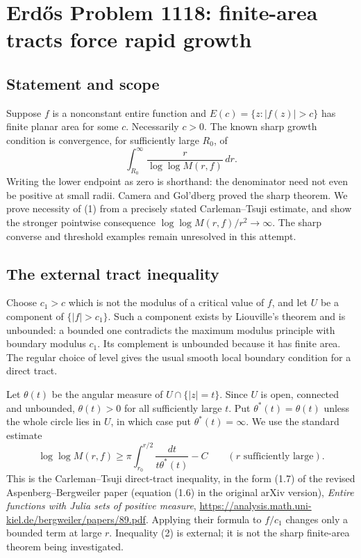 \section*{Erd\H{o}s Problem 1118: finite-area tracts force rapid growth}
\subsection*{Statement and scope}
Suppose $f$ is a nonconstant entire function and $E(c)=\{z:|f(z)|>c\}$ has finite planar area for some $c$. Necessarily $c>0$. The known sharp growth condition is convergence, for sufficiently large $R_0$, of
\[
 \int_{R_0}^{\infty}\frac{r}{\log\log M(r,f)}\,dr.
 \tag{1}
\]
Writing the lower endpoint as zero is shorthand: the denominator need not even be positive at small radii. Camera and Gol'dberg proved the sharp theorem. We prove necessity of (1) from a precisely stated Carleman--Tsuji estimate, and show the stronger pointwise consequence $\log\log M(r,f)/r^2\to\infty$. The sharp converse and threshold examples remain unresolved in this attempt.

\subsection*{The external tract inequality}
Choose $c_1>c$ which is not the modulus of a critical value of $f$, and let $U$ be a component of $\{|f|>c_1\}$. Such a component exists by Liouville's theorem and is unbounded: a bounded one contradicts the maximum modulus principle with boundary modulus $c_1$. Its complement is unbounded because it has finite area. The regular choice of level gives the usual smooth local boundary condition for a direct tract.

Let $\theta(t)$ be the angular measure of $U\cap\{|z|=t\}$. Since $U$ is open, connected and unbounded, $\theta(t)>0$ for all sufficiently large $t$. Put $\theta^*(t)=\theta(t)$ unless the whole circle lies in $U$, in which case put $\theta^*(t)=\infty$.
We use the standard estimate
\[
 \log\log M(r,f)\ge
 \pi\int_{r_0}^{r/2}\frac{dt}{t\theta^*(t)}-C
 \qquad(r\text{ sufficiently large}).
 \tag{2}
\]
This is the Carleman--Tsuji direct-tract inequality, in the form (1.7) of the revised Aspenberg--Bergweiler paper (equation (1.6) in the original arXiv version), \emph{Entire functions with Julia sets of positive measure},
\url{https://analysis.math.uni-kiel.de/bergweiler/papers/89.pdf}.
Applying their formula to $f/c_1$ changes only a bounded term at large $r$. Inequality (2) is external; it is not the sharp finite-area theorem being investigated.


